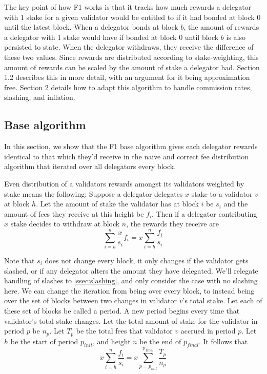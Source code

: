 \documentclass[]{article}
\begin{document}
The key point of how F1 works is that it tracks how much rewards a delegator with 1 stake for a given validator would be entitled to if it had bonded at block 0 until the latest block.
When a delegator bonds at block $b$, the amount of rewards a delegator with 1 stake would have if bonded at block 0 until block $b$ is also persisted to state.
When the delegator withdraws, they receive the difference of these two values.
Since rewards are distributed according to stake-weighting, this amount of rewards can be scaled by the amount of stake a delegator had.
Section 1.2 describes this in more detail, with an argument for it being approximation free. 
Section 2 details how to adapt this algorithm to handle commission rates, slashing, and inflation.

\subsection{Base algorithm}
In this section, we show that the F1 base algorithm gives each delegator rewards identical to that which they'd receive in the naive and correct fee distribution algorithm that iterated over all delegators every block.

Even distribution of a validators rewards amongst its validators weighted by stake means the following: 
Suppose a delegator delegates $x$ stake to a validator $v$ at block $h$.
Let the amount of stake the validator has at block $i$ be $s_i$ and the amount of fees they receive at this height be $f_i$.
Then if a delegator contributing $x$ stake decides to withdraw at block $n$, the rewards they receive are 
$$\sum_{i = h}^{n} \frac{x}{s_i}f_i = x \sum_{i = h}^{n} \frac{f_i}{s_i}$$

Note that $s_i$ does not change every block,
it only changes if the validator gets slashed,
or if any delegator alters the amount they have delegated.
We'll relegate handling of slashes to \autoref{ssec:slashing},
and only consider the case with no slashing here.
We can change the iteration from being over every block, to instead being over the set of blocks between two changes in validator $v$'s total stake.
Let each of these set of blocks be called a period.
A new period begins every time that validator's total stake changes.
Let the total amount of stake for the validator in period $p$ be $n_p$.
Let $T_p$ be the total fees that validator $v$ accrued in period $p$.
Let $h$ be the start of period $p_{init}$, and height $n$ be the end of $p_{final}$.
It follows that 
$$x \sum_{i = h}^{n} \frac{f_i}{s_i} = x \sum_{p = p_{init}}^{p_{final}} \frac{T_p}{n_p}$$
\end{document}
